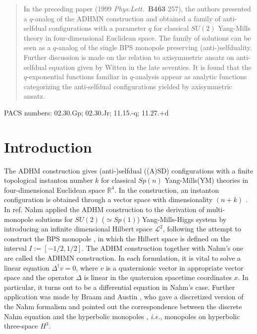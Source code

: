 \documentclass[a4paper,10pt]{article}
\newcommand{\sutwo}{$SU(2)$ }
\newcommand{\ie}{\textit{i.e.}}
\begin{document}
\begin{abstract}
In the preceding paper (1999 \textit{Phys.Lett.~}\textbf{B463} 257), the authors presented a $q$-analog of the ADHMN construction and obtained a family of anti-selfdual configurations with a parameter $q$ for classical \sutwo Yang-Mills theory in four-dimensional Euclidean space.
The family of solutions can be seen as a $q$-analog of the single BPS monopole preserving (anti-)selfduality.
Further discussion is made on the relation to axisymmetric ansatz on anti-selfdual equation given by Witten in the late seventies. 
It is found  that the $q$-exponential functions familiar in $q$-analysis appear as analytic functions categorizing the anti-selfdual configurations yielded by axisymmetric ansatz.
\end{abstract}

PACS numbers: 02.30.Gp; 02.30.Jr; 11.15.-q; 11.27.+d
\newpage
\setcounter{page}{2}
\setcounter{section}{0}
\section{Introduction}
The ADHM construction \cite{AHDM,DM} gives (anti-)selfdual ((A)SD) configurations with a finite topological instanton number $k$ for classical $Sp(n)$ Yang-Mills(YM) theories in four-dimensional Euclidean space $\mathbb{R}^4$.
In the construction, an instanton configuration is obtained through a vector space with dimensionality $(n+k)$ \cite{Corri}. 
In ref.\cite{Nahm82} Nahm applied the ADHM construction to the derivation of multi-monopole solutions for $SU(2)$ ($\simeq Sp(1)$) Yang-Mills-Higgs system by introducing an infinite dimensional Hilbert space $\mathcal{L}^2$, following the attempt\cite{Nahm80} to construct the BPS monopole \cite{Bogo,PS}, in which the Hilbert space is  defined on the interval $I:=[-1/2,1/2]$.
The ADHM construction together with Nahm's one are called the ADHMN construction.
In each formulation, it is vital to solve a linear equation $\Delta^\dagger v=0$, where $v$ is a quaternionic vector in appropriate vector space and the operator $\Delta$ is linear in the quaternion spacetime coordinates $x$.
In particular, it turns out to be a differential equation  in Nahm's case.
Further application was made by Braam and Austin \cite{BA}, who gave a discretized version of the Nahm formalism and pointed out the correspondence between the discrete Nahm equation and the hyperbolic monopoles \cite{Ati}, \ie, monopoles on hyperbolic three-space $H^3$.
\end{document}
